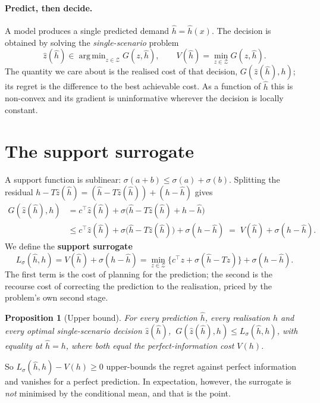 \documentclass[11pt,a4paper]{article}
\newtheorem{proposition}[theorem]{Proposition}
\theoremstyle{remark}
\newcommand{\Z}{\mathcal Z}
\newcommand{\hh}{\hat h}
\newcommand{\Ls}{L_\sigma}
\DeclareMathOperator*{\argmin}{arg\,min}
\begin{document}
\paragraph{Predict, then decide.}
A model produces a single predicted demand $\hh=\hh(x)$. The decision is
obtained by solving the \emph{single-scenario} problem
\[
 \hat z(\hh)\in\argmin_{z\in\Z}G(z,\hh),\qquad V(\hh)=\min_{z\in\Z}G(z,\hh).
\]
The quantity we care about is the realised cost of that decision,
$G(\hat z(\hh),h)$; its regret is the difference to the best achievable cost.
As a function of $\hh$ this is non-convex and its gradient is uninformative
wherever the decision is locally constant.

\section{The support surrogate}\label{sec:surrogate}

A support function is sublinear: $\sigma(a+b)\le\sigma(a)+\sigma(b)$. Splitting
the residual $h-T\hat z(\hh)=(\hh-T\hat z(\hh))+(h-\hh)$ gives
\begin{align*}
 G(\hat z(\hh),h)
 &=c^\top \hat z(\hh)+\sigma\bigl(\hh-T\hat z(\hh)+h-\hh\bigr)\\
 &\le c^\top \hat z(\hh)+\sigma\bigl(\hh-T\hat z(\hh)\bigr)+\sigma(h-\hh)
 \;=\;V(\hh)+\sigma(h-\hh).
\end{align*}
We define the \textbf{support surrogate}
\begin{equation}\label{eq:loss}
 \boxed{\ \Ls(\hh,h)=V(\hh)+\sigma(h-\hh)
        =\min_{z\in\Z}\bigl\{c^\top z+\sigma(\hh-Tz)\bigr\}+\sigma(h-\hh).\ }
\end{equation}
The first term is the cost of planning for the prediction; the second is the
recourse cost of correcting the prediction to the realisation, priced by the
problem's own second stage.

\begin{proposition}[Upper bound]\label{prop:bound}
For every prediction $\hh$, every realisation $h$ and every optimal
single-scenario decision $\hat z(\hh)$,
$\ G(\hat z(\hh),h)\le\Ls(\hh,h)$, with equality at $\hh=h$, where both equal
the perfect-information cost $V(h)$.
\end{proposition}

So $\Ls(\hh,h)-V(h)\ge0$ upper-bounds the regret against perfect information and
vanishes for a perfect prediction. In expectation, however, the surrogate is
\emph{not} minimised by the conditional mean, and that is the point.
\end{document}
